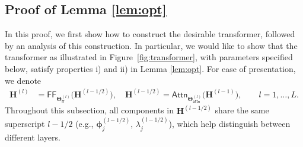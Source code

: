 \documentclass[english]{article}
\newcommand{\Att}{\mathsf{Attn}}
\newcommand{\att}{\mathsf{attn}}
\newcommand{\MLP}{\mathsf{FF}}
\newcommand{\mlp}{\mathsf{ff}}
\begin{document}

\subsection{Proof of Lemma \ref{lem:opt}}
\label{subsec:proof-lem-opt}

In this proof, we first show how to construct the desirable transformer, followed by an analysis of this construction. 
In particular, we would like to show that the transformer as illustrated in Figure~\ref{fig:transformer}, with parameters specified below, satisfy properties i) and ii) in Lemma \ref{lem:opt}.
For ease of presentation, we denote
%
\begin{align}
\bm{H}^{(l)} & =\MLP_{\bm{\Theta}_{\mlp}^{(l)}}\big(\bm{H}^{(l-1/2)}\big), \quad \bm{H}^{(l-1/2)} = \Att_{\bm{\Theta}_{\att}^{(l)}}\big(\bm{H}^{(l-1)}\big),\qquad l = 1, \dots, L. 
\end{align}
%
Throughout this subsection, all components in ${\bm H}^{(l-1/2)}$ share the same superscript $l-1/2$ (e.g., ${\bm \phi}_j^{(l-1/2)}$, $\lambda_j^{(l-1/2)}$),  which help distinguish between different layers.
\end{document}
